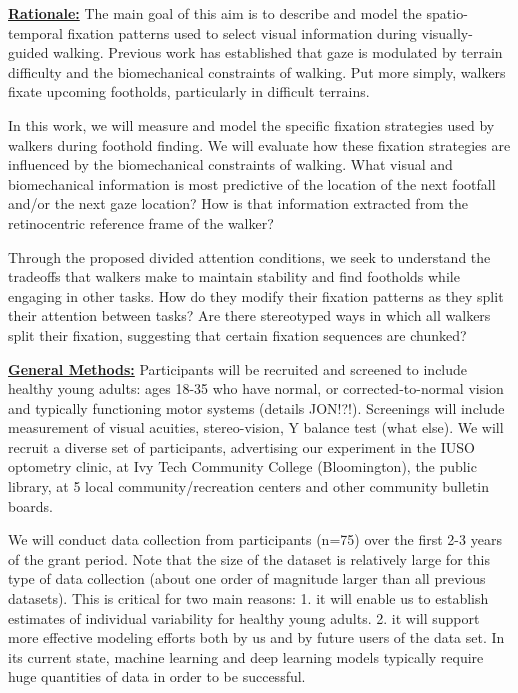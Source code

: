 

\textbf{\underline{Rationale:}} The main goal of this aim is to describe and model the spatio-temporal fixation patterns used to select visual information during visually-guided walking.  Previous work has established that gaze is modulated by terrain difficulty and the biomechanical constraints of walking.  Put more simply, walkers fixate upcoming footholds, particularly in difficult terrains. 

In this work, we will measure and model the specific fixation strategies used by walkers during foothold finding.  We will evaluate how these fixation strategies are influenced by the biomechanical constraints of walking. What visual and biomechanical information is most predictive of the location of the next footfall and/or the next gaze location?  How is that information extracted from the retinocentric reference frame of the walker?

Through the proposed divided attention conditions, we seek to understand the tradeoffs that walkers make to maintain stability and find footholds while engaging in other tasks.  How do they modify their fixation patterns as they split their attention between tasks?  Are there stereotyped ways in which all walkers split their fixation, suggesting that certain fixation sequences are chunked?

\noindent\textbf{\underline{General Methods:}} Participants will be recruited and screened to include healthy young adults: ages 18-35 who have normal, or corrected-to-normal vision and typically functioning motor systems (details JON!?!). Screenings will include measurement of visual acuities, stereo-vision, Y balance test (what else). We will recruit a diverse set of participants, advertising our experiment in the IUSO optometry clinic, at Ivy Tech Community College (Bloomington), the public library, at 5 local community/recreation centers and other community bulletin boards.

We will conduct data collection from participants (n=75) over the first 2-3 years of the grant period. Note that the size of the dataset is relatively large for this type of data collection (about one order of magnitude larger than all previous datasets).  This is critical for two main reasons: 1. it will enable us to establish estimates of individual variability for healthy young adults.  2. it will support more effective modeling efforts both by us and by future users of the data set.  In its current state, machine learning and deep learning models typically require huge quantities of data in order to be successful.

